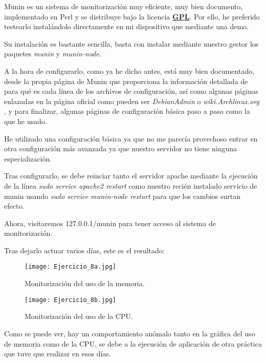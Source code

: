 \documentclass[paper=a4, fontsize=11pt]{scrartcl} %
\numberwithin{equation}{section} %
\numberwithin{figure}{section} %
\numberwithin{table}{section} %
\begin{document}
\begin{enumerate}
		Munin es un sistema de monitorización muy eficiente, muy bien documento\cite{munin_official},
		implementado en Perl y se distribuye bajo la licencia \href{https://www.gnu.org/licenses/gpl.html}
		{\textbf{GPL}}. Por ello, he preferido testearlo instalándolo directamente en mi dispositivo
		que mediante una demo.
		
		Su instalación es bastante sencilla, basta con instalar mediante nuestro gestor los paquetes
		\textit{munin} y \textit{munin-node}.
		
		A la hora de configurarlo, como ya he dicho antes, está muy bien documentado, desde la propia
		página de Munin \cite{munin_official} que proporciona la información detallada de para qué es
		cada línea de los archivos de configuración, así como algunas páginas enlazadas en la página
		oficial como pueden ser \textit{DebianAdmin}\cite{munin_DA} o \textit{wiki.Archlinux.org}
		\cite{munin_archwiki}, y para finalizar, algunas páginas de configuración básica paso a paso
		como la que he usado\cite{munin_conf}.
		
		He utilizado una configuración básica ya que no me parecía provechoso entrar en otra
		configuración más avanzada ya que nuestro servidor no tiene ninguna especialización.
		
		Tras configurarlo, se debe reinciar tanto el servidor apache mediante la ejecución de la línea
		\textit{sudo service apache2 restart} como nuestro recién instalado servicio de munin usando
		\textit{sudo service munin-node restart} para que los cambios surtan efecto.
		
		Ahora, visitaremos 127.0.0.1/munin para tener acceso al sistema de monitorización.
		
		Tras dejarlo actuar varios días, este es el resultado:
		
		\begin{figure}[H]
			\centering
			\texttt{[image: Ejercicio\_8a.jpg]}
			\caption{Monitorización del uso de la memoria.}
			\label{fig:Munin_Mem}
		\end{figure}
		
		\begin{figure}[H]
			\centering
			\texttt{[image: Ejercicio\_8b.jpg]}
			\caption{Monitorización del uso de la CPU.}
			\label{fig:Munin_CPU}
		\end{figure}
		
		Como se puede ver, hay un comportamiento anómalo tanto en la gráfica del uso de memoria como de
		la CPU, se debe a la ejecución de aplicación de otra práctica que tuve que realizar en esos días.
		

\end{enumerate}
\end{document}
